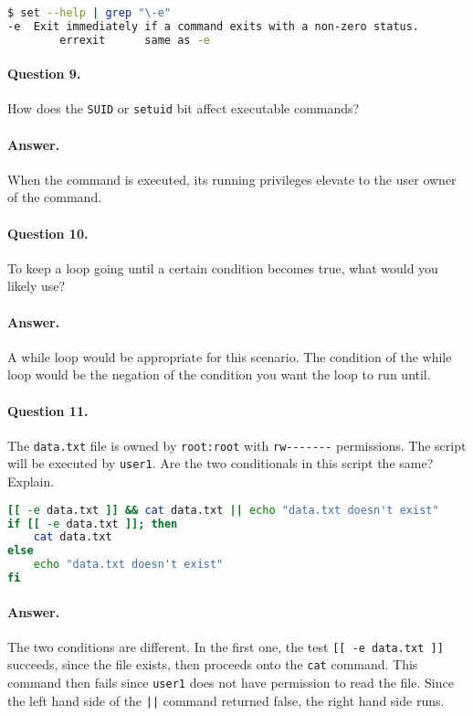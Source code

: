 \documentclass{article}
\begin{document}
\begin{lstlisting}[language=bash]
$ set --help | grep "\-e"
-e  Exit immediately if a command exits with a non-zero status.
		errexit      same as -e
\end{lstlisting}

\paragraph{Question 9.} How does the \verb`SUID` or \verb`setuid` bit affect executable commands?

\paragraph{Answer.} When the command is executed, its running privileges elevate to the user owner of the command.

\paragraph{Question 10.} To keep a loop going until a certain condition becomes true, what would you likely use?

\paragraph{Answer.} A while loop would be appropriate for this scenario. The condition of the while loop would be the negation of the condition you want the loop to run until.

\paragraph{Question 11.} The \verb`data.txt` file is owned by \verb`root:root` with \verb`rw-------` permissions. The script will be executed by \verb`user1`. Are the two conditionals in this script the same? Explain.

\begin{lstlisting}[language=bash]
[[ -e data.txt ]] && cat data.txt || echo "data.txt doesn't exist"
if [[ -e data.txt ]]; then
	cat data.txt
else
	echo "data.txt doesn't exist"
fi
\end{lstlisting}

\paragraph{Answer.} The two conditions are different. In the first one, the test \texttt{[[ -e data.txt ]]} succeeds, since the file exists, then proceeds onto the \verb`cat` command. This command then fails since \verb`user1` does not have permission to read the file. Since the left hand side of the \verb`||` command returned false, the right hand side runs.
\end{document}
